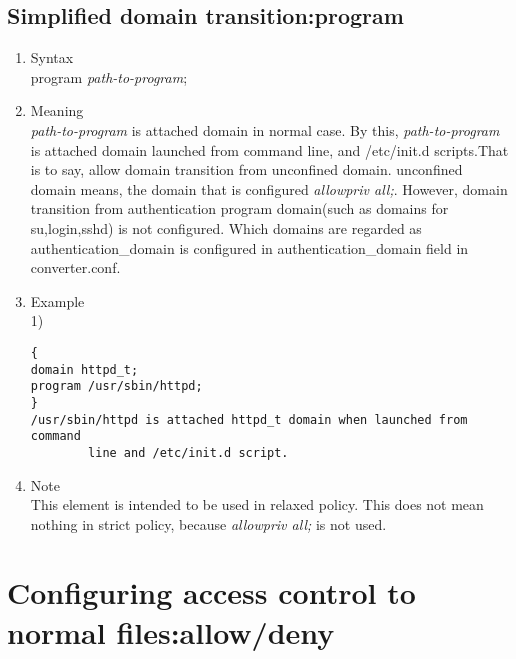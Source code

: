 \documentclass{article}
\begin{document}
\subsection{Simplified domain transition:program}\label{sec:program}
\begin{enumerate}
 \item Syntax\\
    program {\it path-to-program};
 \item Meaning\\
    {\it path-to-program} is attached domain in normal case.   By this, {\it path-to-program} is attached domain launched from
       command line, and /etc/init.d scripts.That is to
       say, allow domain transition from unconfined domain. unconfined
       domain means, the domain that is configured {\it allowpriv all;}.
    However, domain transition from authentication program domain(such as
       domains for su,login,sshd) is not configured. Which domains are
       regarded as authentication\_domain is configured in
       authentication\_domain field in converter.conf.\\
 \item Example\\
1)
\begin{verbatim}
{
domain httpd_t;
program /usr/sbin/httpd;
}
/usr/sbin/httpd is attached httpd_t domain when launched from command
		line and /etc/init.d script.
\end{verbatim}
 \item Note\\
    This element is intended to be used in relaxed policy. This does not
       mean nothing in strict policy, because {\it
       allowpriv all;} is not used.
\end{enumerate}


\section{Configuring access control to normal files:allow/deny}
\end{document}
